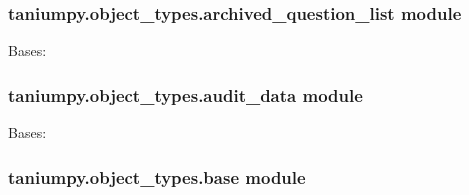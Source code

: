 \documentclass[letterpaper,10pt,english]{sphinxmanual}
\begin{document}
\subsubsection{taniumpy.object\_types.archived\_question\_list module}
\label{taniumpy.object_types:taniumpy-object-types-archived-question-list-module}\label{taniumpy.object_types:module-taniumpy.object_types.archived_question_list}

\begin{fulllineitems}
\label{taniumpy.object_types:taniumpy.object_types.archived_question_list.ArchivedQuestionList}
Bases: {\hyperref[taniumpy.object_types:taniumpy.object_types.base.BaseType]{}}

\end{fulllineitems}



\subsubsection{taniumpy.object\_types.audit\_data module}
\label{taniumpy.object_types:taniumpy-object-types-audit-data-module}\label{taniumpy.object_types:module-taniumpy.object_types.audit_data}

\begin{fulllineitems}
\label{taniumpy.object_types:taniumpy.object_types.audit_data.AuditData}
Bases: {\hyperref[taniumpy.object_types:taniumpy.object_types.base.BaseType]{}}

\end{fulllineitems}



\subsubsection{taniumpy.object\_types.base module}
\label{taniumpy.object_types:taniumpy-object-types-base-module}\label{taniumpy.object_types:module-taniumpy.object_types.base}
\end{document}

